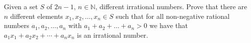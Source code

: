 Given a set $S$ of $2n-1$, $n\in \mathbb N$, different irrational numbers. Prove that there are $n$ different elements $x_1, x_2, \ldots, x_n\in S$ such that for all non-negative rational numbers $a_1, a_2, \ldots, a_n$ with $a_1+a_2+\ldots + a_n>0$ we have that $a_1x_1+a_2x_2+\cdots +a_nx_n$ is an irrational number.